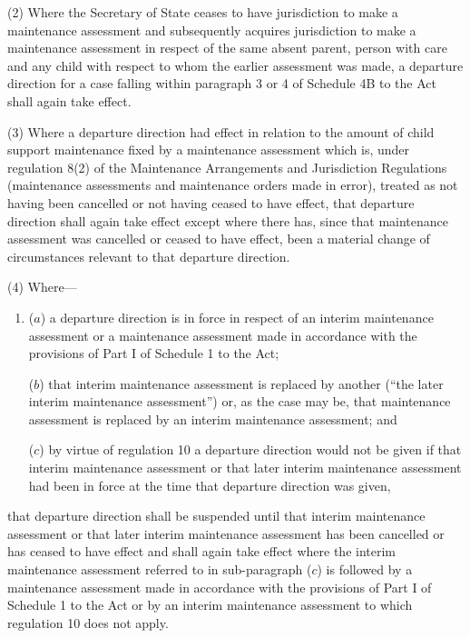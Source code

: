 \documentclass[12pt,a4paper]{article}
\begin{document}
(2) Where 
the Secretary of State  %
ceases to have jurisdiction to make a maintenance assessment and subsequently acquires jurisdiction to make a maintenance assessment in respect of the same absent parent, person with care and any child with respect to whom the earlier assessment was made, a departure direction for a case falling within paragraph 3 or 4 of Schedule 4B to the Act shall again take effect. 

(3) Where a departure direction had effect in relation to the amount of child support maintenance fixed by a maintenance assessment which is, under regulation 8(2) of the Maintenance Arrangements and Jurisdiction Regulations (maintenance assessments and maintenance orders made in error), treated as not having been cancelled or not having ceased to have effect, that departure direction shall again take effect 
except where there has, since that maintenance assessment was cancelled or ceased to have effect, been a material change of circumstances relevant to that departure direction.

(4) Where—
\begin{enumerate}\item[]
($a$) a departure direction is in force in respect of an interim maintenance
assessment or a maintenance assessment made in accordance with the provisions of
Part I of Schedule 1 to the Act;

($b$) that interim maintenance assessment is replaced by another (“the later
interim maintenance assessment”) or, as the case may be, that maintenance
assessment is replaced by an interim maintenance assessment; and

($c$) by virtue of regulation 10 a departure direction would not be given if that
interim maintenance assessment or that later interim maintenance assessment had
been in force at the time that departure direction was given, 
\end{enumerate}
that departure direction shall be suspended until that interim maintenance assessment or that later interim maintenance assessment has been cancelled or has ceased to have effect and shall again take effect 
where the interim maintenance assessment referred to in sub-paragraph ($c$) is followed by a maintenance assessment made in accordance with the provisions of Part I of Schedule 1 to the Act or by an interim maintenance assessment to which regulation 10 does not apply.  %
\end{document}
